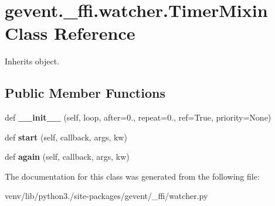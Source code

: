 \hypertarget{classgevent_1_1__ffi_1_1watcher_1_1_timer_mixin}{}\section{gevent.\+\_\+ffi.\+watcher.\+Timer\+Mixin Class Reference}
\label{classgevent_1_1__ffi_1_1watcher_1_1_timer_mixin}


Inherits object.

\subsection*{Public Member Functions}
\begin{DoxyCompactItemize}
\item 
\mbox{\label{classgevent_1_1__ffi_1_1watcher_1_1_timer_mixin_abe501803062e4a081b4630f496cacfa7}} 
def {\bfseries \+\_\+\+\_\+init\+\_\+\+\_\+} (self, loop, after=0., repeat=0., ref=True, priority=None)
\item 
\mbox{\label{classgevent_1_1__ffi_1_1watcher_1_1_timer_mixin_a00d843eff1422e48f21714538b0b650b}} 
def {\bfseries start} (self, callback, args, kw)
\item 
\mbox{\label{classgevent_1_1__ffi_1_1watcher_1_1_timer_mixin_ae55f07afcf1be646cc09878c5d1de182}} 
def {\bfseries again} (self, callback, args, kw)
\end{DoxyCompactItemize}


The documentation for this class was generated from the following file\+:\begin{DoxyCompactItemize}
\item 
venv/lib/python3./site-\/packages/gevent/\+\_\+ffi/watcher.\+py\end{DoxyCompactItemize}
